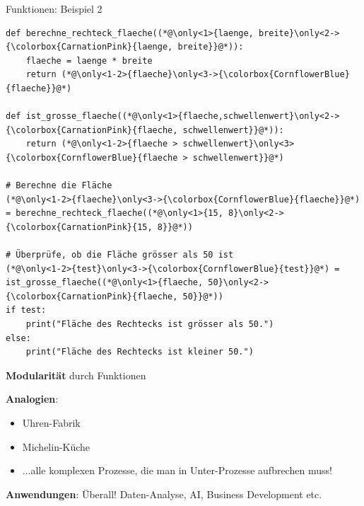 \begin{frame}[fragile]{Funktionen: Beispiel 2}
\begin{lstlisting}
def berechne_rechteck_flaeche((*@\only<1>{laenge, breite}\only<2->{\colorbox{CarnationPink}{laenge, breite}}@*)):
    flaeche = laenge * breite
    return (*@\only<1-2>{flaeche}\only<3->{\colorbox{CornflowerBlue}{flaeche}}@*)

def ist_grosse_flaeche((*@\only<1>{flaeche,schwellenwert}\only<2->{\colorbox{CarnationPink}{flaeche, schwellenwert}}@*)):
    return (*@\only<1-2>{flaeche > schwellenwert}\only<3>{\colorbox{CornflowerBlue}{flaeche > schwellenwert}}@*)

# Berechne die Fläche
(*@\only<1-2>{flaeche}\only<3->{\colorbox{CornflowerBlue}{flaeche}}@*) = berechne_rechteck_flaeche((*@\only<1>{15, 8}\only<2->{\colorbox{CarnationPink}{15, 8}}@*))

# Überprüfe, ob die Fläche grösser als 50 ist
(*@\only<1-2>{test}\only<3->{\colorbox{CornflowerBlue}{test}}@*) = ist_grosse_flaeche((*@\only<1>{flaeche, 50}\only<2->{\colorbox{CarnationPink}{flaeche, 50}}@*))
if test:
    print("Fläche des Rechtecks ist grösser als 50.")
else:
    print("Fläche des Rechtecks ist kleiner 50.")
\end{lstlisting}
\end{frame}

\begin{frame}[fragile]{\textbf{Modularität} durch Funktionen}
	\textbf{Analogien}:
	\begin{itemize}
		\item Uhren-Fabrik
		\item Michelin-Küche
		\item ...alle komplexen Prozesse, die man in Unter-Prozesse aufbrechen muss!
	\end{itemize}
	\textbf{Anwendungen}: Überall! Daten-Analyse, AI, Business Development etc.
\end{frame}


